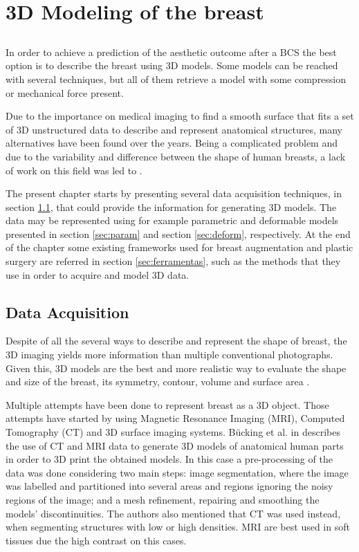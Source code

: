\chapter{3D Modeling of the breast}\label{chap:modeling}

\section*{}

In order to achieve a prediction of the aesthetic outcome after a BCS the best option is to describe the breast using 3D models. Some models can be reached with several techniques, but all of them retrieve a model with some compression or mechanical force present.

Due to the importance on medical imaging to find a smooth surface that fits a set of 3D unstructured data to describe and represent anatomical structures, many alternatives have been found over the years. Being a complicated problem and due to the variability and difference between the shape of human breasts, a lack of work on this field was led to \cite{De2016}.

The present chapter starts by presenting several data acquisition techniques, in section \ref{sec:acquisition}, that could provide the information for generating 3D models. The data may be represented using for example parametric and deformable models presented in section \ref{sec:param} and section \ref{sec:deform}, respectively. At the end of the chapter some existing frameworks used for breast augmentation and plastic surgery are referred in section \ref{sec:ferramentas}, such as the methods that they use in order to acquire and model 3D data.


\section{Data Acquisition}\label{sec:acquisition}

Despite of all the several ways to describe and represent the shape of breast, the 3D imaging yields more information than multiple conventional photographs. Given this, 3D models are the best and more realistic way to evaluate the shape and size of the breast, its symmetry, contour, volume and surface area \cite{Kim2008}.

Multiple attempts have been done to represent breast as a 3D object. Those attempts have started by using Magnetic Resonance Imaging (MRI), Computed Tomography (CT) and 3D surface imaging systems. Bücking et al. in \citep{3dprintplos} describes the use of CT and MRI data to generate 3D models of anatomical human parts in order to 3D print the obtained models. In this case a pre-processing of the data was done considering two main steps: image segmentation, where the image was labelled and partitioned into several areas and regions ignoring the noisy regions of the image; and a mesh refinement, repairing and smoothing the models' discontinuities. The authors also mentioned that CT was used instead, when segmenting structures with low or high densities. MRI are best used in soft tissues due the high contrast on this cases.

